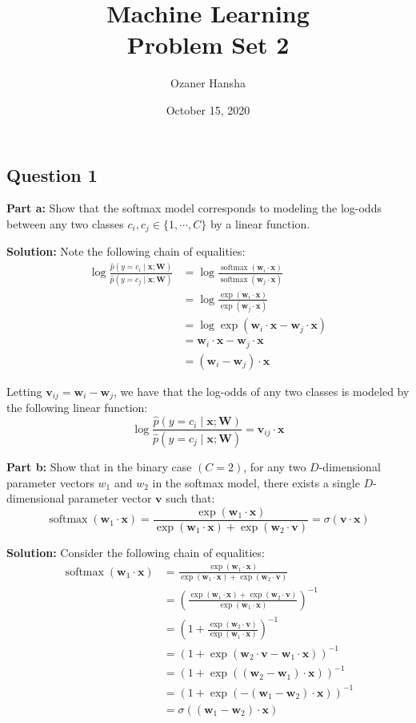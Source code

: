 \documentclass{article}
\renewcommand{\vec}[1]{\mathbf{#1}}
\newcommand{\mat}[1]{\mathbf{#1}}
\begin{document}
\title{Machine Learning\\ Problem Set 2}
\author{Ozaner Hansha}
\date{October 15, 2020}
\maketitle

\subsection*{Question 1}
\noindent\textbf{Part a:} Show that the softmax model corresponds to modeling the log-odds between any two classes $c_i,c_j\in\{1,\cdots, C\}$ by a linear function.
\bigskip

\noindent\textbf{Solution:} Note the following chain of equalities:
\begin{align*}
    \log\frac{\hat{p}(y=c_i\mid \vec x;\mat{W})}{\hat{p}(y=c_j\mid \vec x;\mat{W})}&=\log\frac{\operatorname{softmax}(\vec w_i\cdot\vec x)}{\operatorname{softmax}(\vec w_j\cdot\vec x)}\\
    &=\log\frac{\exp(\vec w_i\cdot\vec x)}{\exp(\vec w_j\cdot\vec x)}\\
    &=\log\exp(\vec w_i\cdot\vec x-\vec w_j\cdot\vec x)\\
    &=\vec w_i\cdot\vec x-\vec w_j\cdot\vec x\\
    &=(\vec w_i-\vec w_j)\cdot\vec x
\end{align*}

Letting $\vec v_{ij}=\vec w_i - \vec w_j$, we have that the log-odds of any two classes is modeled by the following linear function:
$$\log\frac{\hat{p}(y=c_i\mid \vec x;\mat{W})}{\hat{p}(y=c_j\mid \vec x;\mat{W})}=\vec v_{ij}\cdot\vec x$$
\bigskip

\noindent\textbf{Part b:} Show that in the binary case $(C = 2)$, for any two $D$-dimensional parameter vectors $w_1$ and $w_2$ in the softmax model, there exists a single $D$-dimensional parameter vector $\vec v$ such that:
$$\operatorname{softmax}(\vec w_1\cdot \vec x)=\frac{\exp(\vec w_1\cdot \vec x)}{\exp(\vec w_1\cdot \vec x)+\exp(\vec w_2\cdot \vec v)}=\sigma(\vec v\cdot\vec x)$$

\noindent\textbf{Solution:} Consider the following chain of equalities:
\begin{align*}
    \operatorname{softmax}(\vec w_1\cdot\vec x)
    &=\frac{\exp(\vec w_1\cdot \vec x)}{\exp(\vec w_1\cdot \vec x)+\exp(\vec w_2\cdot \vec v)}\\
    &=\left(\frac{\exp(\vec w_1\cdot \vec x)+\exp(\vec w_2\cdot \vec v)}{\exp(\vec w_1\cdot \vec x)}\right)^{-1}\\
    &=\left(1+\frac{\exp(\vec w_2\cdot \vec v)}{\exp(\vec w_1\cdot \vec x)}\right)^{-1}\\
    &=\left(1+\exp(\vec w_2\cdot \vec v-\vec w_1\cdot \vec x)\right)^{-1}\\
    &=\left(1+\exp((\vec w_2-\vec w_1)\cdot \vec x)\right)^{-1}\\
    &=\left(1+\exp(-(\vec w_1-\vec w_2)\cdot \vec x)\right)^{-1}\\
    &=\sigma((\vec w_1-\vec w_2)\cdot \vec x)
\end{align*}
\end{document}

